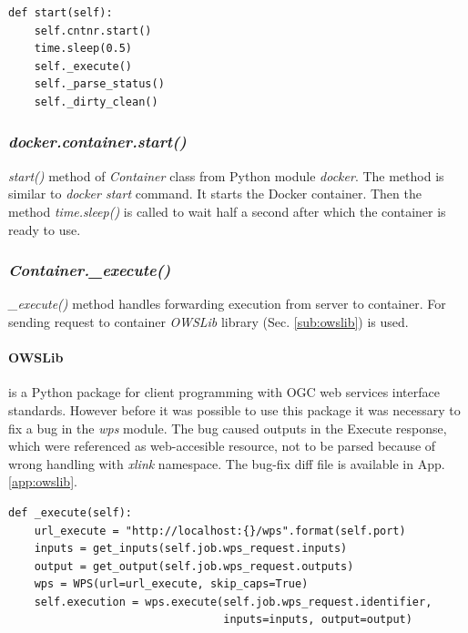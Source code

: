 
\newpage
\begin{lstlisting}[basicstyle=\small,caption={\textit{Container.create()} method},label={lst:Container_start}]
def start(self):
    self.cntnr.start()
    time.sleep(0.5)
    self._execute()
    self._parse_status()
    self._dirty_clean()
\end{lstlisting}

\subsubsection{\textit{docker.container.start()}}
\textit{start()} method of \textit{Container} class from Python module \textit{docker}. The method is similar to \textit{docker start} command. 
It starts the Docker container. Then the method \textit{time.sleep()} is called to wait half a second after which the container is ready to 
use.

\subsubsection{\textit{Container.\_execute()}}
\label{sub:Container_execute}
\textit{\_execute()} method handles forwarding execution from server
to container. For sending request to container \textit{OWSLib}
library (Sec. \ref{sub:owslib}) is used.

\paragraph{OWSLib} is a Python package for client programming with OGC web services interface standards. However before it was possible
to use this package it was necessary to fix a bug in the \textit{wps} module. The bug caused outputs in the Execute response, which
were referenced as web-accesible resource, not to be parsed because of wrong handling with \textit{xlink} namespace. The bug-fix diff file 
is available in App. \ref{app:owslib}. 

\begin{lstlisting}[basicstyle=\small,caption={\textit{Container.\_execute()} method},label={lst:Container._execute}]
def _execute(self):
    url_execute = "http://localhost:{}/wps".format(self.port)
    inputs = get_inputs(self.job.wps_request.inputs)
    output = get_output(self.job.wps_request.outputs)
    wps = WPS(url=url_execute, skip_caps=True)
    self.execution = wps.execute(self.job.wps_request.identifier,
                                 inputs=inputs, output=output)
\end{lstlisting}


